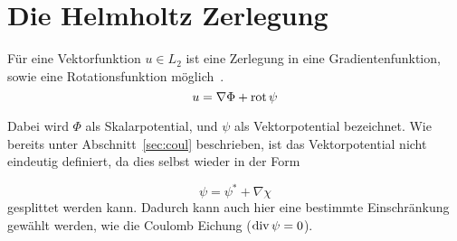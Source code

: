 \section{Die Helmholtz Zerlegung}
Für eine Vektorfunktion $u\in L_2$ ist eine Zerlegung in eine Gradientenfunktion, sowie eine Rotationsfunktion m\"oglich~\cite{Schberl2009NumericalMF}.
\begin{equation}
	u = \nabla\Phi + \mathrm{rot}\,\psi
\end{equation}
\par
Dabei wird $\Phi$ als Skalarpotential, und $\psi$ als Vektorpotential bezeichnet. Wie bereits unter Abschnitt~\ref{sec:coul} beschrieben, ist das Vektorpotential nicht eindeutig definiert, da dies selbst wieder in der Form
\par
\begin{equation}
	\psi = \psi^{*} + \nabla\chi 
\end{equation}
gesplittet werden kann. Dadurch kann auch hier eine bestimmte Einschr\"ankung gew\"ahlt werden, wie die Coulomb Eichung ($\mathrm{div}\, \psi = 0$).

